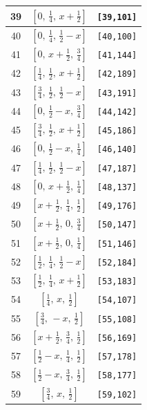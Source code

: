 \documentclass[fleqn,8pt]{jsarticle}
\begin{document}
\begin{longtable}{ccc}
39 & $\left[ 0,\, \frac{1}{4},\, x + \frac{1}{2} \right]$ & {\tt [39,101]} \\ \hline
40 & $\left[ 0,\, \frac{1}{4},\, \frac{1}{2} - x \right]$ & {\tt [40,100]} \\ \hline
41 & $\left[ 0,\, x + \frac{1}{2},\, \frac{3}{4} \right]$ & {\tt [41,144]} \\ \hline
42 & $\left[ \frac{1}{4},\, \frac{1}{2},\, x + \frac{1}{2} \right]$ & {\tt [42,189]} \\ \hline
43 & $\left[ \frac{3}{4},\, \frac{1}{2},\, \frac{1}{2} - x \right]$ & {\tt [43,191]} \\ \hline
44 & $\left[ 0,\, \frac{1}{2} - x,\, \frac{3}{4} \right]$ & {\tt [44,142]} \\ \hline
45 & $\left[ \frac{3}{4},\, \frac{1}{2},\, x + \frac{1}{2} \right]$ & {\tt [45,186]} \\ \hline
46 & $\left[ 0,\, \frac{1}{2} - x,\, \frac{1}{4} \right]$ & {\tt [46,140]} \\ \hline
47 & $\left[ \frac{1}{4},\, \frac{1}{2},\, \frac{1}{2} - x \right]$ & {\tt [47,187]} \\ \hline
48 & $\left[ 0,\, x + \frac{1}{2},\, \frac{1}{4} \right]$ & {\tt [48,137]} \\ \hline
49 & $\left[ x + \frac{1}{2},\, \frac{1}{4},\, \frac{1}{2} \right]$ & {\tt [49,176]} \\ \hline
50 & $\left[ x + \frac{1}{2},\, 0,\, \frac{3}{4} \right]$ & {\tt [50,147]} \\ \hline
51 & $\left[ x + \frac{1}{2},\, 0,\, \frac{1}{4} \right]$ & {\tt [51,146]} \\ \hline
52 & $\left[ \frac{1}{2},\, \frac{1}{4},\, \frac{1}{2} - x \right]$ & {\tt [52,184]} \\ \hline
53 & $\left[ \frac{1}{2},\, \frac{1}{4},\, x + \frac{1}{2} \right]$ & {\tt [53,183]} \\ \hline
54 & $\left[ \frac{1}{4},\, x,\, \frac{1}{2} \right]$ & {\tt [54,107]} \\ \hline
55 & $\left[ \frac{3}{4},\, - x,\, \frac{1}{2} \right]$ & {\tt [55,108]} \\ \hline
56 & $\left[ x + \frac{1}{2},\, \frac{3}{4},\, \frac{1}{2} \right]$ & {\tt [56,169]} \\ \hline
57 & $\left[ \frac{1}{2} - x,\, \frac{1}{4},\, \frac{1}{2} \right]$ & {\tt [57,178]} \\ \hline
58 & $\left[ \frac{1}{2} - x,\, \frac{3}{4},\, \frac{1}{2} \right]$ & {\tt [58,177]} \\ \hline
59 & $\left[ \frac{3}{4},\, x,\, \frac{1}{2} \right]$ & {\tt [59,102]} \\ \hline

\end{longtable}
\end{document}
